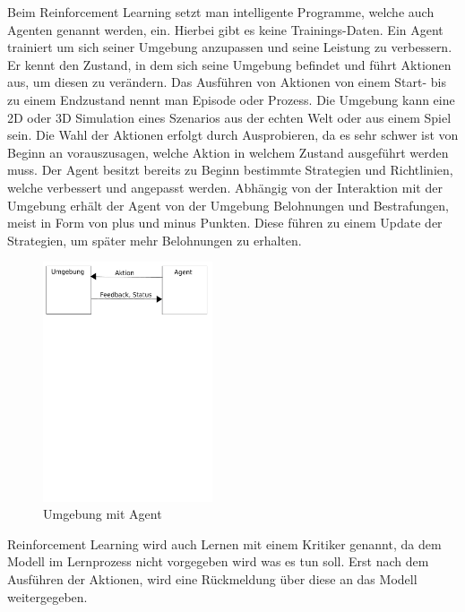 Beim Reinforcement Learning setzt man intelligente Programme, welche auch Agenten genannt werden, ein. Hierbei gibt es keine Trainings-Daten. \cite{Nandy2018} Ein Agent trainiert um sich seiner Umgebung anzupassen und seine Leistung zu verbessern. \cite{Sarkar2018} \newline
	Er kennt den Zustand, in dem sich seine Umgebung befindet und führt Aktionen aus, um diesen zu verändern. Das Ausführen von Aktionen von einem Start- bis zu einem Endzustand nennt man Episode oder Prozess. \cite{Alpaydin2004}\newline  
	Die Umgebung kann eine 2D oder 3D Simulation eines Szenarios aus der echten Welt oder aus einem Spiel sein.  
	Die Wahl der Aktionen erfolgt durch Ausprobieren, da es sehr schwer ist von Beginn an vorauszusagen, welche Aktion in welchem Zustand ausgeführt werden muss. \cite{Nandy2018} Der Agent besitzt bereits zu Beginn bestimmte Strategien und Richtlinien, welche verbessert und angepasst werden. \cite{Sarkar2018}
	Abhängig von der Interaktion mit der Umgebung erhält der Agent von der Umgebung Belohnungen und Bestrafungen, meist in Form von plus und minus Punkten. \cite{Nandy2018} Diese führen zu einem Update der Strategien, um später mehr Belohnungen zu erhalten. \cite{Sarkar2018}\newline
	\begin{figure}[H]
		\centering
		\includegraphics[width=5cm]{Bilder/Reinforcement.pdf}
		\caption{Umgebung mit Agent}
		\label{fig:abb6}
	\end{figure}
	Reinforcement Learning wird auch Lernen mit einem Kritiker genannt, da dem Modell im Lernprozess nicht vorgegeben wird was es tun soll. Erst nach dem Ausführen der Aktionen, wird eine Rückmeldung über diese an das Modell weitergegeben. \cite{Alpaydin2004}
	
